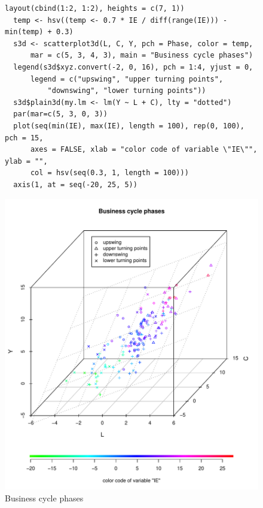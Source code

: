 \begin{figure}[H]
\vspace*{-10mm}
\footnotesize
\begin{Verbatim}[frame=single]
  layout(cbind(1:2, 1:2), heights = c(7, 1))
  temp <- hsv((temp <- 0.7 * IE / diff(range(IE))) - min(temp) + 0.3)
  s3d <- scatterplot3d(L, C, Y, pch = Phase, color = temp,
      mar = c(5, 3, 4, 3), main = "Business cycle phases")
  legend(s3d$xyz.convert(-2, 0, 16), pch = 1:4, yjust = 0,
      legend = c("upswing", "upper turning points",
          "downswing", "lower turning points"))
  s3d$plain3d(my.lm <- lm(Y ~ L + C), lty = "dotted")
  par(mar=c(5, 3, 0, 3))
  plot(seq(min(IE), max(IE), length = 100), rep(0, 100), pch = 15,
      axes = FALSE, xlab = "color code of variable \"IE\"", ylab = "",
      col = hsv(seq(0.3, 1, length = 100)))
  axis(1, at = seq(-20, 25, 5))
\end{Verbatim}
\normalsize
\begin{center}\includegraphics[width=13cm]{business}\end{center}
\vspace*{-5mm}\caption{Business cycle phases\label{business}}
\end{figure}

